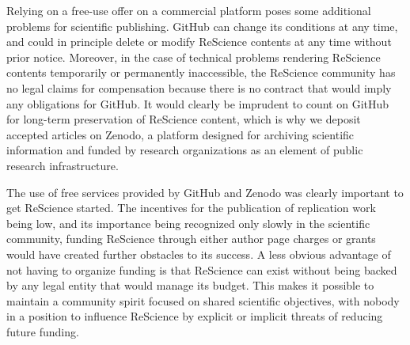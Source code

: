 \documentclass[11pt]{article}
\begin{document}
Relying on a free-use offer on a commercial platform poses some
additional problems for scientific publishing. GitHub can change its
conditions at any time, and could in principle delete or modify
ReScience contents at any time without prior notice. Moreover, in the
case of technical problems rendering ReScience contents temporarily or
permanently inaccessible, the ReScience community has no legal claims
for compensation because there is no contract that would imply any
obligations for GitHub. It would clearly be imprudent to count on
GitHub for long-term preservation of ReScience content, which is why
we deposit accepted articles on Zenodo, a platform designed for
archiving scientific information and funded by research organizations
as an element of public research infrastructure.

The use of free services provided by GitHub and Zenodo was clearly
important to get ReScience started. The incentives for the publication
of replication work being low, and its importance being recognized
only slowly in the scientific community, funding ReScience through
either author page charges or grants would have created further
obstacles to its success. A less obvious advantage of not having to
organize funding is that ReScience can exist without being backed by
any legal entity that would manage its budget. This makes it possible
to maintain a community spirit focused on shared scientific
objectives, with nobody in a position to influence ReScience by
explicit or implicit threats of reducing future funding.
\end{document}
